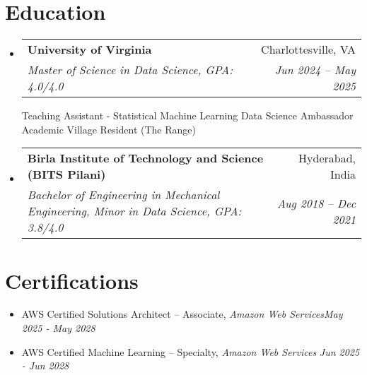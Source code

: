 \documentclass[letterpaper,11pt]{article}
\makeatletter
\newcommand{\resumeItem}[1]{
\justifying
  \item{\small{#1}}
  \vspace{-2px}
}
\newcommand{\resumeSubheading}[4]{
  \item
    \begin{tabular*}{1\textwidth}{l@{\extracolsep{\fill}}r}
      \textbf{\large{#1}} & {\small{#2}} \\
      {\textsl{{#3}}} & {\textsl{\small{#4}}}
    \end{tabular*}
  \vspace{-0.5cm}
}
\newcommand{\resumeSubHeadingListStart}{\begin{itemize}[leftmargin=0.0in, label={}]}
\newcommand{\resumeSubHeadingListEnd}{\end{itemize}}
\newcommand{\resumeItemListStart}{
  \vspace{-5pt}
  \begin{itemize}[leftmargin=0.21in, label=\textbullet]
}
\newcommand{\resumeItemListEnd}{\end{itemize}}
\makeatother
\begin{document}
\vspace{-16pt}
\section{\Large{Education}}
\vspace{3pt}
\resumeSubHeadingListStart

\resumeSubheading
    {University of Virginia}{Charlottesville, VA}
    {Master of Science in Data Science, GPA: 4.0/4.0}{Jun 2024 -- May 2025}

\vspace{4px}
\footnotesize{
Teaching Assistant - Statistical Machine Learning {\textbullet}
Data Science Ambassador {\textbullet}
Academic Village Resident (The Range)\\


}



\resumeSubHeadingListEnd
\vspace{-14pt}
\resumeSubHeadingListStart
\resumeSubheading
    {Birla Institute of Technology and Science \normalsize{(BITS Pilani)}}{Hyderabad, India}
    {Bachelor of Engineering in Mechanical Engineering, Minor in Data Science, GPA: 3.8/4.0}{Aug 2018 -- Dec 2021}

\resumeSubHeadingListEnd


\vspace{-9pt}
\section{\Large{Certifications}}
\vspace{9pt}
\resumeItemListStart

\resumeItem{AWS Certified Solutions Architect – Associate, \textsl{Amazon Web Services}\hfill\sl{May 2025 - May 2028}}

\resumeItem{\vspace{-6pt}AWS Certified Machine Learning – Specialty, \textsl{Amazon Web Services} \hfill\sl{Jun 2025 - Jun 2028}}

\resumeItemListEnd
\end{document}
